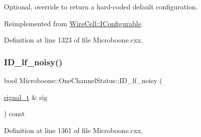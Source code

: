 Optional, override to return a hard-\/coded default configuration. 



Reimplemented from \hyperlink{class_wire_cell_1_1_i_configurable_a54841b2da3d1ea02189478bff96f7998}{Wire\+Cell\+::\+I\+Configurable}.



Definition at line 1323 of file Microboone.\+cxx.

\mbox{\label{class_wire_cell_1_1_sig_proc_1_1_microboone_1_1_one_channel_status_a3836d07fe79d2efedd72838ac4e13d92}} 
\subsubsection{\texorpdfstring{I\+D\+\_\+lf\+\_\+noisy()}{ID\_lf\_noisy()}}
{\footnotesize\ttfamily bool Microboone\+::\+One\+Channel\+Status\+::\+I\+D\+\_\+lf\+\_\+noisy (\begin{DoxyParamCaption}\item[{\hyperlink{class_wire_cell_1_1_i_channel_filter_a434ed96cc4b805fa0eeec14f9f8d85e9}{signal\+\_\+t} \&}]{sig }\end{DoxyParamCaption}) const}



Definition at line 1361 of file Microboone.\+cxx.

